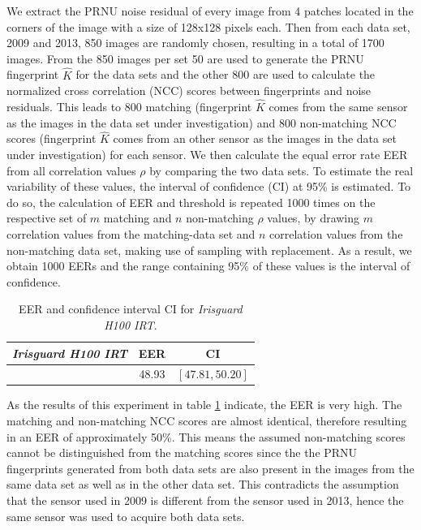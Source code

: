 \documentclass[10pt,twocolumn,letterpaper]{article}
\begin{document}
We extract the PRNU noise residual of every image from 4 patches located in the corners of the image with a size of 128x128 pixels each. Then from each data set, 2009 and 2013, 850 images are randomly chosen, resulting in a total of 1700 images. From the 850 images per set 50 are used to generate the PRNU fingerprint $\hat{K}$ for the data sets and the other 800 are used to calculate the normalized cross correlation (NCC) scores between fingerprints and noise residuals. 
This leads to 800 matching (fingerprint $\hat{K}$ comes from the same sensor as the images in the data set under investigation) and 800 non-matching NCC scores (fingerprint $\hat{K}$ comes from an other sensor as the images in the data set under investigation) for each sensor.
We then calculate the equal error rate EER from all correlation values $\rho$ by comparing the two data sets. To estimate the real variability of these values, the interval of confidence (CI) at 95\% is estimated. To do so, the calculation of EER and threshold is repeated 1000 times on the respective set of $m$ matching and $n$ non-matching $\rho$ values, by drawing $m$ correlation values from the matching-data set and $n$ correlation values from the non-matching data set, making use of sampling with replacement. As a result, we obtain 1000 EERs and the range containing 95\% of these values is the interval of confidence. 

  \begin{table}[hbt] 
   \begin{center}
	\begin{tabular}{ c | c | c}
		  \emph{Irisguard H100 IRT} & EER & CI \\ 
		  \hline
		   [\%] &  48.93 & $[47.81 , 50.20]$
	\end{tabular}
   \end{center}
     \caption{EER and confidence interval CI for \emph{Irisguard H100 IRT}.}
\label{table:sensor_identification}
 \end{table}

As the results of this experiment in table \ref{table:sensor_identification} indicate, the EER is very high. The matching and non-matching NCC scores are almost identical, therefore resulting in an EER of approximately 50\%. This means the assumed non-matching scores cannot be distinguished from the matching scores since the the PRNU fingerprints generated from both data sets are also present in the images from the same data set as well as in the other data set. This contradicts the assumption that the sensor used in 2009 is different from the sensor used in 2013, hence the same sensor was used to acquire both data sets.
\end{document}
